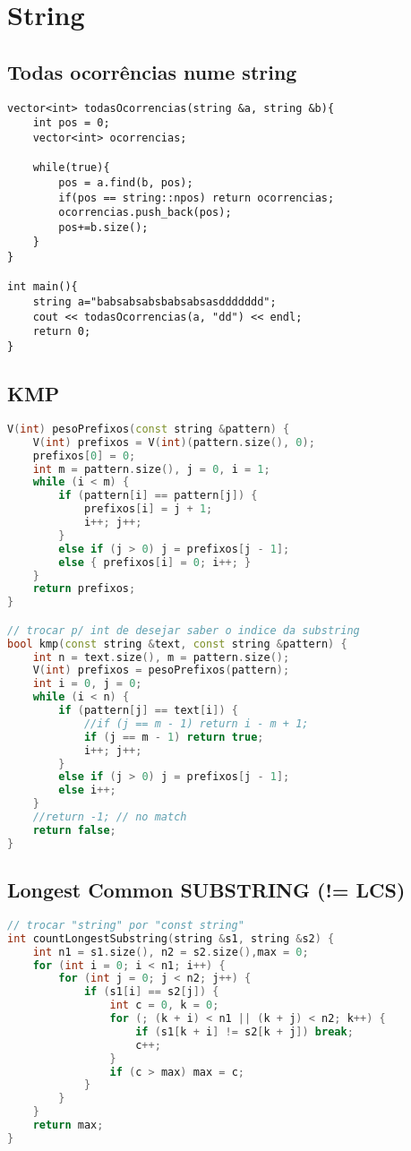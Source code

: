 \chapter{String}

\section{Todas ocorrências nume string}
\begin{lstlisting}
vector<int> todasOcorrencias(string &a, string &b){
	int pos = 0;
	vector<int> ocorrencias;
	
	while(true){
		pos = a.find(b, pos);
		if(pos == string::npos) return ocorrencias;
		ocorrencias.push_back(pos);
		pos+=b.size();		
	}
}

int main(){
	string a="babsabsabsbabsabsasddddddd";
	cout << todasOcorrencias(a, "dd") << endl;
	return 0;
}
\end{lstlisting}


\section{KMP}
\begin{lstlisting}[language=C++]
V(int) pesoPrefixos(const string &pattern) {
    V(int) prefixos = V(int)(pattern.size(), 0);
    prefixos[0] = 0;
    int m = pattern.size(), j = 0, i = 1;
    while (i < m) {
        if (pattern[i] == pattern[j]) {
            prefixos[i] = j + 1;
            i++; j++;
        }
        else if (j > 0) j = prefixos[j - 1];
        else { prefixos[i] = 0; i++; }
    }
    return prefixos;
}

// trocar p/ int de desejar saber o indice da substring
bool kmp(const string &text, const string &pattern) {
    int n = text.size(), m = pattern.size();
    V(int) prefixos = pesoPrefixos(pattern);
    int i = 0, j = 0;
    while (i < n) {
        if (pattern[j] == text[i]) {
            //if (j == m - 1) return i - m + 1;
            if (j == m - 1) return true;
            i++; j++;
        }
        else if (j > 0) j = prefixos[j - 1];
        else i++;
    }
    //return -1; // no match
    return false;
}
\end{lstlisting}

\section{Longest Common SUBSTRING (!= LCS)}
\begin{lstlisting}[language=C++]
// trocar "string" por "const string"
int countLongestSubstring(string &s1, string &s2) {
    int n1 = s1.size(), n2 = s2.size(),max = 0;
    for (int i = 0; i < n1; i++) {
        for (int j = 0; j < n2; j++) {
            if (s1[i] == s2[j]) {
                int c = 0, k = 0;
                for (; (k + i) < n1 || (k + j) < n2; k++) {
                    if (s1[k + i] != s2[k + j]) break;
                    c++;
                }
                if (c > max) max = c;
            }
        }
    }
    return max;
}
\end{lstlisting}

